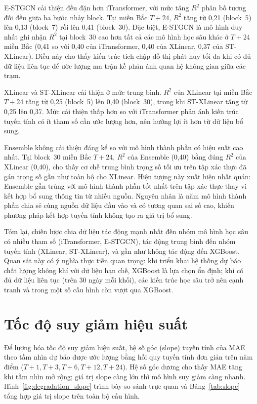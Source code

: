 E-STGCN cải thiện đều đặn hơn iTransformer, với mức tăng $R^2$ phân bố tương đối đều giữa ba bước nhảy block. Tại miền Bắc $T{+}24$, $R^2$ tăng từ 0,21 (block~5) lên 0,13 (block~7) rồi lên 0,41 (block~30). Đặc biệt, E-STGCN là mô hình duy nhất ghi nhận $R^2$ tại block~30 cao hơn tất cả các mô hình học sâu khác ở $T{+}24$ miền Bắc (0,41 so với 0,40 của iTransformer, 0,40 của XLinear, 0,37 của ST-XLinear). Điều này cho thấy kiến trúc tích chập đồ thị phát huy tối đa khi có đủ dữ liệu liên tục để ước lượng ma trận kề phản ánh quan hệ không gian giữa các trạm.

XLinear và ST-XLinear cải thiện ở mức trung bình. $R^2$ của XLinear tại miền Bắc $T{+}24$ tăng từ 0,25 (block~5) lên 0,40 (block~30), trong khi ST-XLinear tăng từ 0,25 lên 0,37. Mức cải thiện thấp hơn so với iTransformer phản ánh kiến trúc tuyến tính có ít tham số cần ước lượng hơn, nên hưởng lợi ít hơn từ dữ liệu bổ sung.

Ensemble không cải thiện đáng kể so với mô hình thành phần có hiệu suất cao nhất. Tại block~30 miền Bắc $T{+}24$, $R^2$ của Ensemble (0,40) bằng đúng $R^2$ của XLinear (0,40), cho thấy cơ chế trung bình trọng số tối ưu trên tập xác thực đã gán trọng số gần như toàn bộ cho XLinear. Hiện tượng này xuất hiện nhất quán: Ensemble gần trùng với mô hình thành phần tốt nhất trên tập xác thực thay vì kết hợp bổ sung thông tin từ nhiều nguồn. Nguyên nhân là năm mô hình thành phần chia sẻ cùng nguồn dữ liệu đầu vào và có tương quan sai số cao, khiến phương pháp kết hợp tuyến tính không tạo ra giá trị bổ sung.

Tóm lại, chiến lược chia dữ liệu tác động mạnh nhất đến nhóm mô hình học sâu có nhiều tham số (iTransformer, E-STGCN), tác động trung bình đến nhóm tuyến tính (XLinear, ST-XLinear), và gần như không tác động đến XGBoost. Quan sát này có ý nghĩa thực tiễn quan trọng: khi triển khai hệ thống dự báo chất lượng không khí với dữ liệu hạn chế, XGBoost là lựa chọn ổn định; khi có đủ dữ liệu liên tục (trên 30 ngày mỗi khối), các kiến trúc học sâu trở nên cạnh tranh và trong một số cấu hình còn vượt qua XGBoost.

\section{Tốc độ suy giảm hiệu suất}

Để lượng hóa tốc độ suy giảm hiệu suất, hệ số góc (slope) tuyến tính của MAE theo tầm nhìn dự báo được ước lượng bằng hồi quy tuyến tính đơn giản trên năm điểm ($T{+}1, T{+}3, T{+}6, T{+}12, T{+}24$). Hệ số góc dương cho thấy MAE tăng khi tầm nhìn mở rộng; giá trị slope càng lớn thì mô hình suy giảm càng nhanh. Hình~\ref{fig:degradation_slope} trình bày so sánh trực quan và Bảng~\ref{tab:slope} tổng hợp giá trị slope trên toàn bộ cấu hình.

